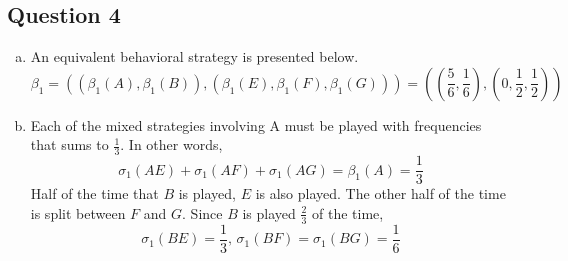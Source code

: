 \documentclass{article}
\begin{document}

\subsection*{Question 4}

\begin{enumerate}[(a)]
	\item An equivalent behavioral strategy is presented below.
		\[
			\beta_1 = \left(\left(\beta_1(A),\beta_1(B)\right),\left(\beta_1(E),\beta_1(F),\beta_1(G)\right)\right) = \left(\left(\frac{5}{6},\frac{1}{6}\right),\left(0,\frac{1}{2},\frac{1}{2}\right)\right)
		\]
	
	\item Each of the mixed strategies involving A must be played with frequencies that sums to $\frac{1}{3}$. In other words,
		\[
			\sigma_1(AE) + \sigma_1(AF) + \sigma_1(AG) = \beta_1(A) = \frac{1}{3}
		\]
		Half of the time that $B$ is played, $E$ is also played. The other half of the time is split between $F$ and $G$. Since $B$ is played $\frac{2}{3}$ of the time,
		\[
			\sigma_1(BE) = \frac{1}{3}\text{, }\sigma_1(BF)=\sigma_1(BG)=\frac{1}{6}
		\]
	
\end{enumerate}


	


\end{document}
